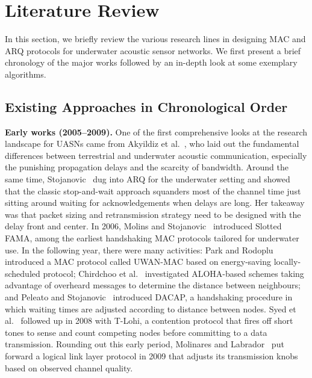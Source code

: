 \documentclass{article}
\begin{document}
\section{Literature Review} \label{sec:lit_review}

In this section, we briefly review the various research lines in designing MAC and ARQ protocols for underwater acoustic sensor networks. We first present a brief chronology of the major works followed by an in-depth look at some exemplary algorithms.

\subsection{Existing Approaches in Chronological Order} \label{sec:chronological}

\textbf{Early works (2005--2009).} One of the first comprehensive looks at the research landscape for UASNs came from Akyildiz et al.~\cite{akyildiz2005}, who laid out the fundamental differences between terrestrial and underwater acoustic communication, especially the punishing propagation delays and the scarcity of bandwidth. Around the same time, Stojanovic~\cite{stojanovic2005} dug into ARQ for the underwater setting and showed that the classic stop-and-wait approach squanders most of the channel time just sitting around waiting for acknowledgements when delays are long. Her takeaway was that packet sizing and retransmission strategy need to be designed with the delay front and center. In 2006, Molins and Stojanovic~\cite{slottedfama2006} introduced Slotted FAMA, among the earliest handshaking MAC protocols tailored for underwater use. In the following year, there were many activities: Park and Rodoplu~\cite{uwmac2007} introduced a MAC protocol called UWAN-MAC based on energy-saving locally-scheduled protocol; Chirdchoo et al.~\cite{chirdchoo2007} investigated ALOHA-based schemes taking advantage of overheard messages to determine the distance between neighbours; and Peleato and Stojanovic~\cite{dacap2007} introduced DACAP, a handshaking procedure in which waiting times are adjusted according to distance between nodes. Syed et al.~\cite{tlohi2008} followed up in 2008 with T-Lohi, a contention protocol that fires off short tones to sense and count competing nodes before committing to a data transmission. Rounding out this early period, Molinares and Labrador~\cite{molinares2009} put forward a logical link layer protocol in 2009 that adjusts its transmission knobs based on observed channel quality.
\end{document}
